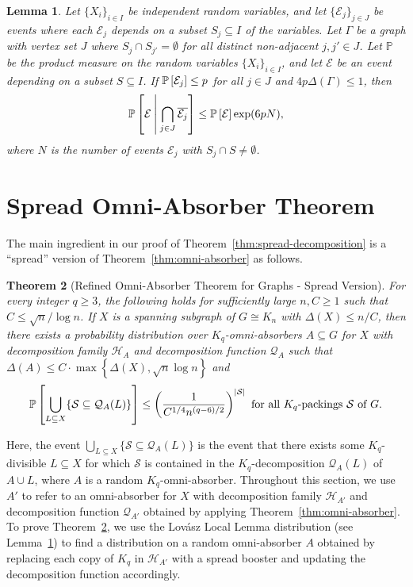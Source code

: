 \documentclass[11pt]{article}
\numberwithin{equation}{section}
\newcounter{i}
\theoremstyle{plain}
\newtheorem{thm}{Theorem}[section]
\newtheorem{lem}[thm]{Lemma}
\theoremstyle{plain} %
\theoremstyle{definition}
\newcommand{\cQ}{\mathcal{Q}}
\newcommand{\cE}{\mathcal{E}}
\newcommand{\cS}{\mathcal{S}}
\newcommand{\cH}{\mathcal{H}}
\newcommand{\Prob}[1]{\ensuremath{%
\mathbb P\left[#1\right]
}}
\newcommand{\ProbCond}[2]{\ensuremath{%
    \mathbb P\left[#1\:\middle|\:#2\right]
  }}
\begin{document}
\begin{lem}\label{lem:conditionalLLL}
    Let $\{X_i\}_{i\in I}$ be independent random variables, and let $\{\cE_j\}_{j\in J}$ be events where each $\cE_j$ depends on a subset $S_j \subseteq I$ of the variables.  Let $\Gamma$ be a graph with vertex set $J$ where $S_j \cap S_{j'} = \emptyset$ for all distinct non-adjacent $j,j'\in J$.  Let $\mathbb P$ be the product measure on the random variables $\{X_i\}_{i\in I}$, and let $\cE$ be an event depending on a subset $S \subseteq I$.
    If $\Prob{\cE_j} \leq p$ for all $j \in J$ and $4p\Delta(\Gamma) \leq 1$, then 
    \begin{equation*}
        \ProbCond{\cE}{\bigcap_{j \in J}\overline{\cE_j}} \leq \Prob{\cE}\exp(6pN),
    \end{equation*}
    where $N$ is the number of events $\cE_j$ with $S_j \cap S \neq \emptyset$.
\end{lem}

\section{Spread Omni-Absorber Theorem}\label{s:SpreadOmniAbsorber}

The main ingredient in our proof of Theorem~\ref{thm:spread-decomposition} is a ``spread'' version of Theorem~\ref{thm:omni-absorber} as follows.

\begin{thm}[Refined Omni-Absorber Theorem for Graphs - Spread Version]\label{thm:OmniSpread}
    For every integer $q \ge 3$, the following holds for sufficiently large $n,C\ge 1$ such that $C \leq \sqrt{n} / {\log n}$.
    If $X$ is a spanning subgraph of $G \cong K_n$ with $\Delta(X) \le n / C$, then there exists a probability distribution over $K_q$-omni-absorbers $A \subseteq G$ for $X$ with decomposition family $\cH_A$ and decomposition function $\cQ_A$ such that $\Delta(A)\le C \cdot \max \left\{\Delta(X), \sqrt{n}\log n\right\}$ and 
    \begin{equation*}
        \Prob{\bigcup_{L\subseteq X}\{\cS \subseteq \cQ_A(L)\}} \le \left(\frac{1}{C^{1/4}n^{(q - 6)/2}}\right)^{|\cS|} \text{ for all $K_q$-packings $\cS$ of $G$.}
    \end{equation*}
\end{thm}
Here, the event $\bigcup_{L\subseteq X}\{\cS \subseteq \cQ_A(L)\}$ is the event that there exists some $K_q$-divisible $L \subseteq X$ for which $\cS$ is contained in the $K_q$-decomposition $\cQ_A(L)$ of $A \cup L$, where $A$ is a random $K_q$-omni-absorber.
Throughout this section, we use $A'$ to refer to an omni-absorber for $X$ with decomposition family $\cH_{A'}$ and decomposition function $\cQ_{A'}$ obtained by applying Theorem~\ref{thm:omni-absorber}.  To prove Theorem~\ref{thm:OmniSpread}, we use the Lov\'asz Local Lemma distribution (see Lemma~\ref{lem:conditionalLLL}) to find a distribution on a random omni-absorber $A$ obtained by replacing each copy of $K_q$ in $\cH_{A'}$ with a spread booster and updating the decomposition function accordingly.
\end{document}
